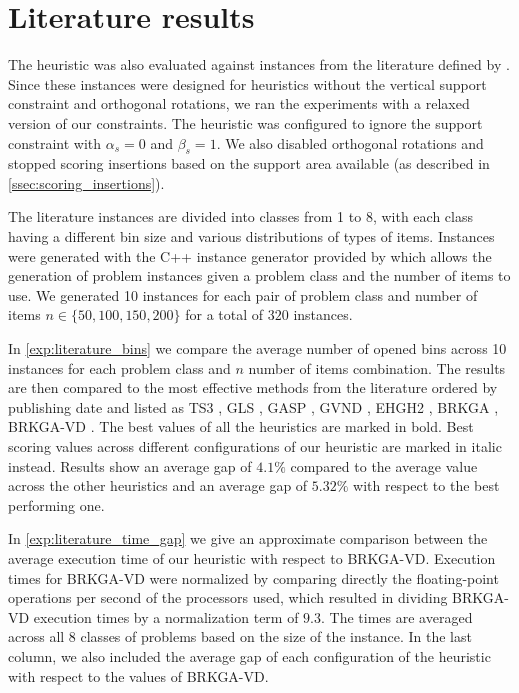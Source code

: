 \section{Literature results}
The heuristic was also evaluated against instances from the literature defined by \citeauthor{martello2000three}.
Since these instances were designed for heuristics without the vertical support constraint and orthogonal rotations, we ran the experiments with a relaxed version of our constraints.
The heuristic was configured to ignore the support constraint with $\alpha_s = 0$ and $\beta_s = 1$. We also disabled orthogonal rotations and stopped scoring insertions based on the support area available (as described in \cref{ssec:scoring_insertions}).

\label{def:class1_instances}
The literature instances are divided into classes from 1 to 8, with each class having a different bin size and various distributions of types of items.
Instances were generated with the C++ instance generator provided by \citeauthor{martello2000three} which allows the generation of problem instances given a problem class and the number of items to use. %
We generated 10 instances for each pair of problem class and number of items $n \in \{50, 100, 150, 200\}$ for a total of $320$ instances.

In \cref{exp:literature_bins} we compare the average number of opened bins across 10 instances for each problem class and $n$ number of items combination.
The results are then compared to the most effective methods from the literature ordered by publishing date and listed as TS3 \citep{lodi2002heuristic}, GLS \citep{faroe2003guided}, GASP \citep{crainic2009ts2pack}, GVND \citep{parreno2010hybrid}, EHGH2 \citep{hifi2014hybrid}, BRKGA \citep{gonccalves2013biased}, BRKGA-VD \citep{zudio2018brkga}.
The best values of all the heuristics are marked in bold. Best scoring values across different configurations of our heuristic are marked in italic instead.
Results show an average gap of $4.1\%$ compared to the average value across the other heuristics and an average gap of $5.32\%$ with respect to the best performing one.

In \cref{exp:literature_time_gap} we give an approximate comparison between the average execution time of our heuristic with respect to BRKGA-VD. Execution times for BRKGA-VD were normalized by comparing directly the floating-point operations per second of the processors used, which resulted in dividing BRKGA-VD execution times by a normalization term of $9.3$. 
The times are averaged across all 8 classes of problems based on the size of the instance. In the last column, we also included the average gap of each configuration of the heuristic with respect to the values of BRKGA-VD. %
\label{exp:literature_tests}




